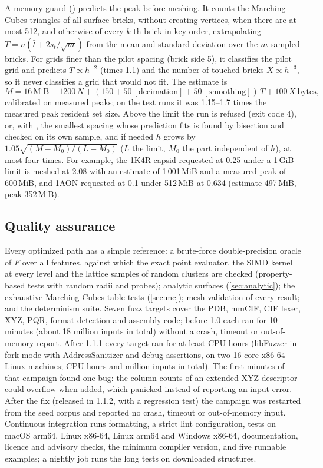 A memory guard () predicts the peak before meshing. It
counts the Marching Cubes triangles of all surface bricks, without creating
vertices, when there are at most 512, and otherwise of every $k$-th brick
in key order, extrapolating $T = n(\bar t + 2 s_t/\sqrt m)$ from the mean
and standard deviation over the $m$ sampled bricks. For grids finer than
the pilot spacing (brick side 5\Ang), it classifies the pilot grid and
predicts $T \propto h^{-2}$ (times 1.1) and the number of touched bricks
$X \propto h^{-3}$, so it never classifies a grid that would not fit. The
estimate is
\begin{equation}
  M = 16\,\text{MiB} + 1200\,N + (150 + 50\,[\text{decimation}]
    + 50\,[\text{smoothing}])\,T + 100\,X \ \text{bytes},
\end{equation}
calibrated on measured peaks; on the test runs it was 1.15--1.7 times the
measured peak resident set size. Above the limit the run is refused (exit
code 4), or, with , the smallest spacing whose
prediction fits is found by bisection and checked on its own sample, and if
needed $h$ grows by $1.05\sqrt{(M - M_0)/(L - M_0)}$ ($L$ the limit, $M_0$
the part independent of $h$), at most four times. For example, the 1K4R
capsid requested at 0.25\Ang{} under a 1\,GiB limit is meshed at 2.08\Ang{}
with an estimate of 1\,001\,MiB and a measured peak of 600\,MiB, and 1AON
requested at 0.1\Ang{} under 512\,MiB at 0.634\Ang{} (estimate 497\,MiB,
peak 352\,MiB).

\subsection{Quality assurance}
\label{sec:qa}

Every optimized path has a simple reference: a brute-force double-precision
oracle of $F$ over all features, against which the exact point evaluator,
the SIMD kernel at every level and the lattice samples of random clusters
are checked (property-based tests with random radii and probes); analytic
surfaces (\cref{sec:analytic}); the exhaustive Marching Cubes table tests
(\cref{sec:mc}); mesh validation of every result; and the determinism suite.
Seven fuzz targets cover the PDB, mmCIF, CIF lexer, XYZ, PQR, format
detection and assembly code; before 1.0 each ran for 10 minutes (about 18
million inputs in total) without a crash, timeout or out-of-memory report.
After 1.1.1 every target ran for at least  CPU-hours
(libFuzzer in fork mode with AddressSanitizer and debug assertions, on two
16-core x86-64 Linux machines;  CPU-hours and
 million inputs in total). The first minutes of that
campaign found one bug: the column counts of an extended-XYZ
 descriptor could overflow when added, which panicked
instead of reporting an input error. After the fix (released in 1.1.2, with a
regression test) the campaign was restarted from the seed corpus and
reported no crash, timeout or out-of-memory input. Continuous
integration runs formatting, a strict lint configuration, tests on macOS
arm64, Linux x86-64, Linux arm64 and Windows x86-64, documentation, licence
and advisory checks, the minimum compiler version, and five runnable
examples; a nightly job runs the long tests on downloaded structures.
